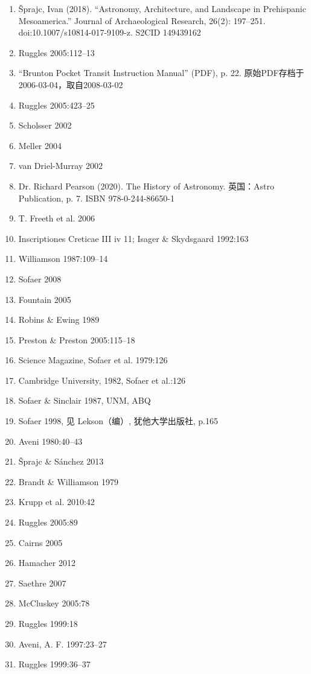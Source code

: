 \begin{enumerate}
    \item Šprajc, Ivan (2018). “Astronomy, Architecture, and Landscape in Prehispanic Mesoamerica.” Journal of Archaeological Research, 26(2): 197–251. doi:10.1007/s10814-017-9109-z. S2CID 149439162
    \item Ruggles 2005:112–13
    \item “Brunton Pocket Transit Instruction Manual” (PDF), p. 22. 原始PDF存档于2006-03-04，取自2008-03-02
    \item Ruggles 2005:423–25
    \item Scholsser 2002
    \item Meller 2004
    \item van Driel-Murray 2002
    \item Dr. Richard Pearson (2020). The History of Astronomy. 英国：Astro Publication, p. 7. ISBN 978-0-244-86650-1
    \item T. Freeth et al. 2006
    \item Inscriptiones Creticae III iv 11; Isager \& Skydsgaard 1992:163
    \item Williamson 1987:109–14
    \item Sofaer 2008
    \item Fountain 2005
    \item Robins \& Ewing 1989
    \item Preston \& Preston 2005:115–18
    \item Science Magazine, Sofaer et al. 1979:126
    \item Cambridge University, 1982, Sofaer et al.:126
    \item Sofaer \& Sinclair 1987, UNM, ABQ
    \item Sofaer 1998, 见 Lekson（编）, 犹他大学出版社, p.165
    \item Aveni 1980:40–43
    \item Šprajc \& Sánchez 2013
    \item Brandt \& Williamson 1979
    \item Krupp et al. 2010:42
    \item Ruggles 2005:89
    \item Cairns 2005
    \item Hamacher 2012
    \item Saethre 2007
    \item McCluskey 2005:78
    \item Ruggles 1999:18
    \item Aveni, A. F. 1997:23–27
    \item Ruggles 1999:36–37

\end{enumerate}
